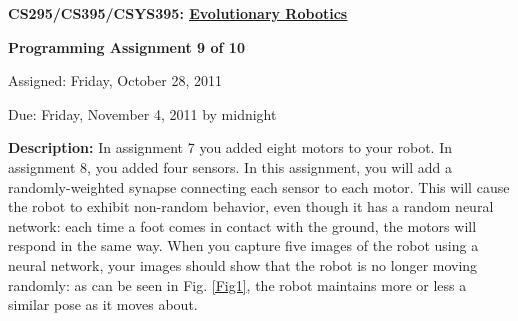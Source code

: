 \documentclass[12pt]{article}
\begin{document}
\centerline{\bf \Large CS295/CS395/CSYS395: \href{CS295_395_Syllabus.pdf}{\underline{Evolutionary Robotics}}}

\vspace{0.5cm}

\centerline{\bf \large Programming Assignment 9 of 10}

\vspace{0.5cm}

\centerline{\large Assigned: Friday, October 28, 2011}

\vspace{0.5cm}

\centerline{\large Due: Friday, November 4, 2011 by midnight}

\vspace{0.5cm}

\noindent \textbf{Description:} In assignment 7 you added eight motors to your robot. In assignment 8, you added four sensors. In this assignment, you will add a randomly-weighted synapse connecting each sensor to each motor. This will cause the robot to exhibit non-random behavior, even though it has a random neural network: each time a foot comes in contact with the ground, the motors will respond in the same way. When you capture five images of the robot using a neural network, your images should show that the robot is no longer moving randomly: as can be seen in Fig. \ref{Fig1}, the robot maintains more or less a similar pose as it moves about.
\end{document}
